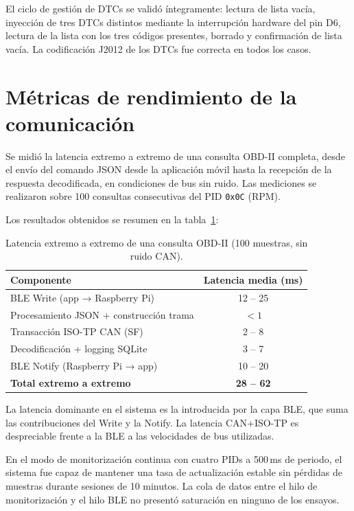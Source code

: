 El ciclo de gestión de DTCs se validó íntegramente: lectura de lista vacía, inyección de tres DTCs distintos mediante la interrupción hardware del pin D6, lectura de la lista con los tres códigos presentes, borrado y confirmación de lista vacía. La codificación J2012 de los DTCs fue correcta en todos los casos.


\section{Métricas de rendimiento de la comunicación}
\label{sec:resultados_rendimiento}

Se midió la latencia extremo a extremo de una consulta OBD-II completa, desde el envío del comando JSON desde la aplicación móvil hasta la recepción de la respuesta decodificada, en condiciones de bus sin ruido. Las mediciones se realizaron sobre 100 consultas consecutivas del PID \texttt{0x0C} (RPM).

Los resultados obtenidos se resumen en la tabla~\ref{tab:latencias}:

\begin{table}[!htbp]
\caption{Latencia extremo a extremo de una consulta OBD-II (100 muestras, sin ruido CAN).}
\label{tab:latencias}
\centering
\renewcommand{\arraystretch}{1.2}
\begin{tabular}{|l|c|}
\hline
\textbf{Componente} & \textbf{Latencia media (ms)} \\
\hline
BLE Write (app → Raspberry Pi) & 12 -- 25 \\
Procesamiento JSON + construcción trama & $< 1$ \\
Transacción ISO-TP CAN (SF) & 2 -- 8 \\
Decodificación + logging SQLite & 3 -- 7 \\
BLE Notify (Raspberry Pi → app) & 10 -- 20 \\
\hline
\textbf{Total extremo a extremo} & \textbf{28 -- 62} \\
\hline
\end{tabular}
\end{table}

La latencia dominante en el sistema es la introducida por la capa BLE, que suma las contribuciones del Write y la Notify. La latencia CAN+ISO-TP es despreciable frente a la BLE a las velocidades de bus utilizadas.

En el modo de monitorización continua con cuatro PIDs a 500\,ms de periodo, el sistema fue capaz de mantener una tasa de actualización estable sin pérdidas de muestras durante sesiones de 10 minutos. La cola de datos entre el hilo de monitorización y el hilo BLE no presentó saturación en ninguno de los ensayos.


